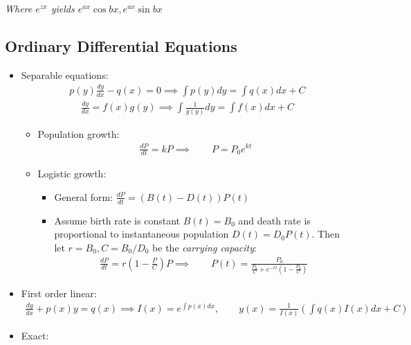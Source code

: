 \emph{Where \(e^{zx}\) yields \(e^{ax}\cos bx, e^{ax}\sin bx\)}

\hypertarget{ordinary-differential-equations}{%
\subsection{Ordinary Differential
Equations}\label{ordinary-differential-equations}}

\begin{itemize}
\tightlist
\item
  Separable equations:
  \begin{align*}p(y)\frac{dy}{dx} - q(x) = 0 \implies \int p(y) dy = \int q(x) dx + C\end{align*}
  \begin{align*}
  \frac{dy}{dx} = f(x)g(y) \implies \int \frac{1}{g(y)}dy = \int f(x) dx + C
  \end{align*}

  \begin{itemize}
  \tightlist
  \item
    Population growth:
    \begin{align*}\frac{dP}{dt} = kP \implies \qquad P = P_0 e^{kt}\end{align*}
  \item
    Logistic growth:

    \begin{itemize}
    \tightlist
    \item
      General form: \(\frac{dP}{dt} =(B(t) - D(t))P(t)\)
    \item
      Assume birth rate is constant \(B(t) = B_0\) and death rate is
      proportional to instantaneous population \(D(t) = D_0 P(t)\). Then
      let \(r = B_0, C = B_0/D_0\) be the \emph{carrying capacity}:
      \begin{align*}\frac{dP}{dt} = r\left( 1 - \frac{P}{C} \right)P \implies \qquad P(t) = \frac{P_0}{\frac{P_0}{C} + e^{-rt}(1 - \frac{P_0}{C})}\end{align*}
    \end{itemize}
  \end{itemize}
\item
  First order linear:
  \begin{align*}\frac{dy}{dx} + p(x)y = q(x) \implies I(x) = e^{\int p(x) dx},\qquad y(x) = \frac{1}{I(x)}\left(\int q(x)I(x) dx + C\right)\end{align*}
\item
  Exact:


\end{itemize}
